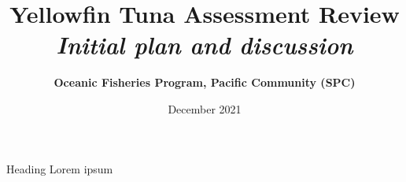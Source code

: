 \documentclass[aspectratio=169]{beamer}
\begin{document}
\begin{frame}
  \title{Yellowfin Tuna Assessment Review\\
  {\large\it Initial plan and discussion}}
  \author{\darkblue\bf Oceanic Fisheries Program, Pacific Community (SPC)}
  \date{ December 2021}
  \titlepage
\end{frame}

\begin{frame}{Heading}
  Lorem ipsum
\end{frame}
\end{document}
